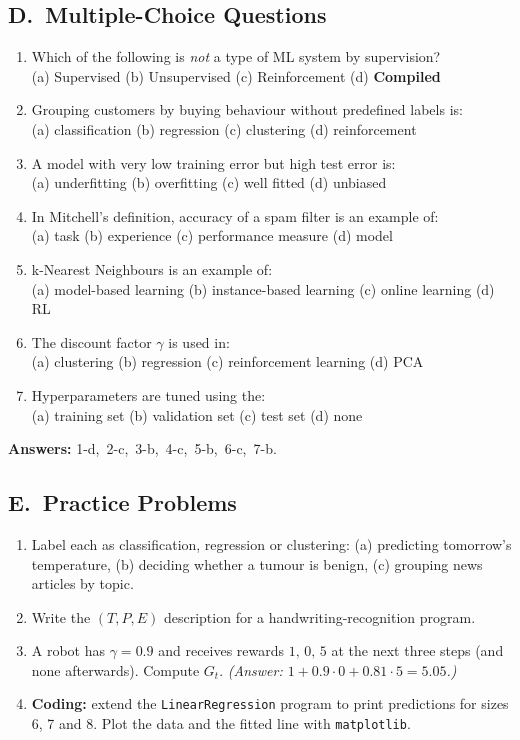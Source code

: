 \subsection*{D.\ Multiple-Choice Questions}
\begin{enumerate}
  \item Which of the following is \emph{not} a type of ML system by supervision? \\
  (a) Supervised \quad (b) Unsupervised \quad (c) Reinforcement \quad (d) \textbf{Compiled}
  \item Grouping customers by buying behaviour without predefined labels is: \\
  (a) classification \quad (b) regression \quad (c) clustering \quad (d) reinforcement
  \item A model with very low training error but high test error is: \\
  (a) underfitting \quad (b) overfitting \quad (c) well fitted \quad (d) unbiased
  \item In Mitchell's definition, accuracy of a spam filter is an example of: \\
  (a) task \quad (b) experience \quad (c) performance measure \quad (d) model
  \item k-Nearest Neighbours is an example of: \\
  (a) model-based learning \quad (b) instance-based learning \quad (c) online learning \quad (d) RL
  \item The discount factor $\gamma$ is used in: \\
  (a) clustering \quad (b) regression \quad (c) reinforcement learning \quad (d) PCA
  \item Hyperparameters are tuned using the: \\
  (a) training set \quad (b) validation set \quad (c) test set \quad (d) none
\end{enumerate}
\textbf{Answers:} 1-d,\ 2-c,\ 3-b,\ 4-c,\ 5-b,\ 6-c,\ 7-b.

\subsection*{E.\ Practice Problems}
\begin{enumerate}
  \item Label each as classification, regression or clustering: (a) predicting tomorrow's temperature, (b) deciding whether a tumour is benign, (c) grouping news articles by topic.
  \item Write the $(T,P,E)$ description for a handwriting-recognition program.
  \item A robot has $\gamma=0.9$ and receives rewards $1,\,0,\,5$ at the next three steps (and none afterwards). Compute $G_t$. \textit{(Answer: $1+0.9\cdot0+0.81\cdot5=5.05$.)}
  \item \textbf{Coding:} extend the \texttt{LinearRegression} program to print predictions for sizes 6, 7 and 8. Plot the data and the fitted line with \texttt{matplotlib}.
\end{enumerate}

